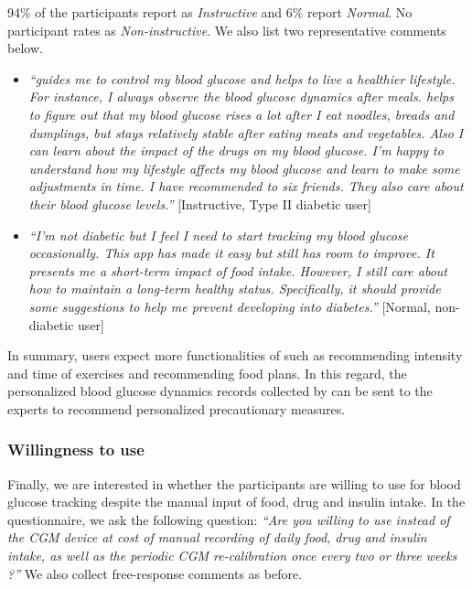 {94\% of the participants report \sysname as \textit{Instructive} and 6\% report \textit{Normal}.
No participant rates \sysname as \textit{Non-instructive}.
We also list two representative comments below.
\begin{itemize}
  \item
  \textit{``\sysname guides me to control my blood glucose and helps to live a healthier lifestyle.
  For instance, I always observe the blood glucose dynamics after meals.
  \sysname helps to figure out that my blood glucose rises a lot after I eat noodles, breads and dumplings, but stays relatively stable after eating meats and vegetables.
  Also I can learn about the impact of the drugs on my blood glucose.
  I'm happy to understand how my lifestyle affects my blood glucose and learn to make some adjustments in time.
  I have recommended \sysname to six friends.
  They also care about their blood glucose levels.''}
  [Instructive, Type II diabetic user]
  \item
  \textit{``I'm not diabetic but I feel I need to start tracking my blood glucose occasionally.
  This app has made it easy but still has room to improve.
  It presents me a short-term impact of food intake.
  However, I still care about how to maintain a long-term healthy status.
  Specifically, it should provide some suggestions to help me prevent developing into diabetes.''}
  [Normal, non-diabetic user]
\end{itemize}
In summary, users expect more functionalities of \sysname such as recommending intensity and time of exercises and recommending food plans.
In this regard, the personalized blood glucose dynamics records collected by \sysname can be sent to the experts to recommend personalized precautionary measures.

\subsubsection{Willingness to use \sysname}
Finally, we are interested in whether the participants are willing to use \sysname for blood glucose tracking despite the manual input of food, drug and insulin intake.
In the questionnaire, we ask the following question:
\textit{``Are you willing to use \sysname instead of the CGM device at cost of manual recording of daily food, drug and insulin intake, as well as the periodic CGM re-calibration once every two or three weeks ?''}
We also collect free-response comments as before.

}
